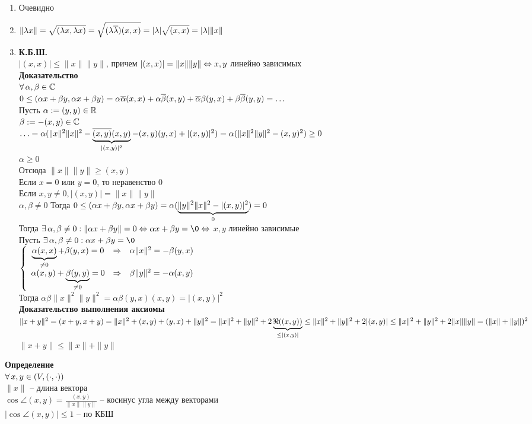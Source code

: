 \documentclass[12pt]{article}
\begin{document}
\begin{enumerate}
    \item Очевидно
    \item $\|\lambda x\| = \sqrt{(\lambda x, \lambda x)} = \sqrt{(\lambda\ol\lambda)(x,x)} = |\lambda|\sqrt{(x,x)} = |\lambda|\|x\|$
    \item 
    \textbf{К.Б.Ш.}\\
    $|(x,x)| \leq \|x\|\|y\|$, причем $|(x,x)| = \|x\|\|y\| \LRto x,y$ линейно зависимых\\
    \textbf{Доказательство}\\
    $\fall \alpha, \beta \in \Cset$\\
    $0 \leq (\alpha x + \beta y, \alpha x + \beta y) = \alpha\ol\alpha(x,x) + \alpha\ol\beta(x,y) + \ol\alpha\beta(y,x) + \beta\ol\beta(y,y) = \ldots$\\
    Пусть $\alpha:= (y,y) \in \Rset$\\
    $\beta := -(x,y) \in \Cset$\\
    $\ldots = \alpha(\|x\|^2\|x\|^2 - \ub{|(x,y)|^2}{\ol{(x,y)}(x,y)} - (x,y)(y,x) + |(x,y)|^2) = \alpha(\|x\|^2\|y\|^2 - (x,y)^2) \geq 0$\\
    $\alpha \geq 0$\\
    Отсюда $\|x\|\|y\| \geq (x,y)$\\
    Если $x = 0$ или $y = 0$, то неравенство 0\\
    Если $x,y\neq 0, |(x,y)|=\|x\|\|y\|$\\
    $\alpha, \beta \neq 0$
    Тогда $0 \leq (\alpha x + \beta y, \alpha x + \beta y) = \alpha(\ub{0}{\|y\|^2\|x\|^2 - |(x,y)|^2}) = 0$\\
    Тогда $\ex \alpha, \beta \neq 0 : \|\alpha x + \beta y\| = 0 \LRto \alpha x + \beta y = \0 \LRto$ $x, y$ линейно зависимые\\
    Пусть $\ex \alpha, \beta \neq 0: \alpha x + \beta y = \0$\\
    $\left\{\begin{array}{ccc}
        \ub{\neq 0}{\alpha (x,x)} + \beta(y,x) = 0 & \Rto & \alpha\|x\|^2 = -\beta(y,x)\\
        \alpha (x,y) + \ub{\neq 0}{\beta(y,y)} = 0 & \Rto & \beta\|y\|^2 = -\alpha(x,y)
    \end{array}\right.$\\
    Тогда $\alpha\beta\|x\|^2\|y\|^2 = \alpha\beta(y,x)(x,y) = |(x,y)|^2$\\
    \textbf{Доказательство выполнения аксиомы}\\
    $\|x+y\|^2 = (x+y,x+y) = \|x\|^2 + (x,y) + (y, x) + \|y\|^2 = \|x\|^2 + \|y\|^2 + 2\ub{\leq |(x,y)|}{\Re((x,y))} \leq \|x\|^2 + \|y\|^2 + 2|(x,y)| \leq \|x\|^2+\|y\|^2 + 2\|x\|\|y\| = (\|x\|+\|y\|)^2$\\
    $\|x+y\| \leq \|x\| + \|y\|$
\end{enumerate}
\textbf{Определение}\\
$\fall x, y \in (V, (\cdot, \cdot))$\\
$\|x\|$ -- длина вектора\\
$\cos \angle(x,y) = \frac{(x,y)}{\|x\|\|y\|}$ -- косинус угла между векторами\\
$|\cos \angle(x,y)| \leq 1$ -- по КБШ\\
\end{document}
